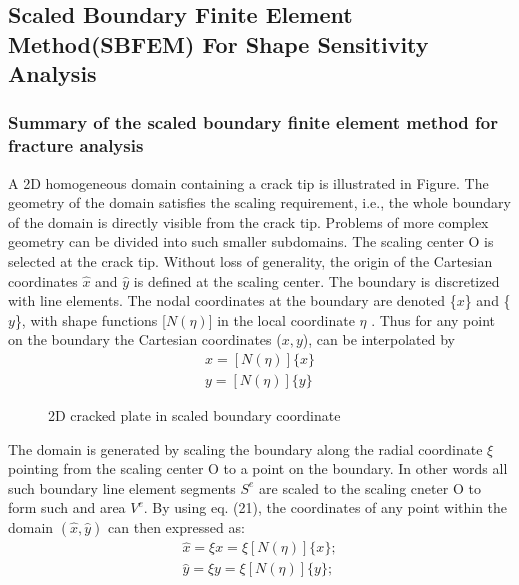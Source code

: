 \documentclass[12pt]{article}
\begin{document}
\subsection{Scaled Boundary Finite Element Method(SBFEM) For Shape Sensitivity Analysis}
\subsubsection{Summary of the scaled boundary finite element method for fracture analysis}A 2D homogeneous domain containing a crack tip is illustrated in Figure. The geometry of the domain satisfies the scaling
requirement, i.e., the whole boundary of the domain is directly visible from the crack tip. Problems of more complex 
geometry can be divided into such smaller subdomains.
The scaling center O is selected at the crack tip.
Without loss of generality, the origin of the Cartesian coordinates $\hat{x}$ and $\hat{y}$
is defined at the scaling center. The boundary is discretized with line elements. The nodal coordinates at the boundary
are denoted \{$x$\} and \{$y$\},
with shape functions [$N( \eta )$] in the local coordinate $\eta$ . Thus for any point on the boundary the Cartesian 
coordinates ($x, y$), can be interpolated by 
\begin{align*}
    x = [N(\eta)]\{x\}\\
    y = [N(\eta)]\{y\} \tag{21} \label{21}
\end{align*}
\begin{figure}[H]
    \centering
    \captionsetup{labelformat=empty}
    \caption{2D cracked plate in scaled boundary coordinate}  
\end{figure}

The domain is generated by scaling the boundary along the radial coordinate $\xi$ 
pointing from the scaling center O to a point
on the boundary. In other words all such boundary line element segments
$S^e$ are scaled to the scaling cneter O to form such and area $V^e$. By using eq. (21), the coordinates of any point within the domain $(\hat{x}, \hat{y})$
can then expressed as:
\begin{align*}
    \hat{x} = \xi x = \xi [N(\eta)]\{x\};\\
    \hat{y} = \xi y = \xi [N(\eta)]\{y\}; \tag{22} \label{22}
\end{align*}
\end{document}
